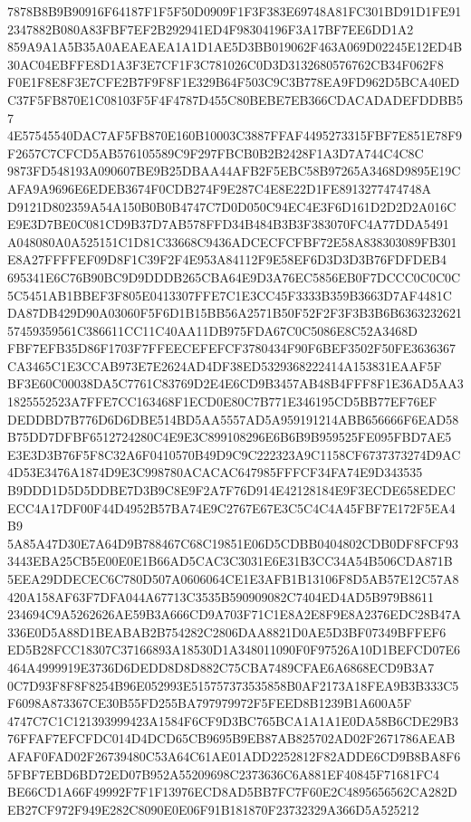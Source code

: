\documentclass[UTF8,fontset=fandol,zihao=-4,a4paper]{ctexart}
\begin{document}
{{7878B8B9B90916F64187F1F5F50D0909F1F3F383E69748A81FC301BD91D1FE912347882B080A83FBF7EF2B292941ED4F98304196F3A17BF7EE6DD1A2
859A9A1A5B35A0AEAEAEA1A1D1AE5D3BB019062F463A069D02245E12ED4B30AC04EBFFE8D1A3F3E7CF1F3C781026C0D3D3132680576762CB34F062F8
F0E1F8E8F3E7CFE2B7F9F8F1E329B64F503C9C3B778EA9FD962D5BCA40EDC37F5FB870E1C08103F5F4F4787D455C80BEBE7EB366CDACADADEFDDBB57
4E57545540DAC7AF5FB870E160B10003C3887FFAF4495273315FBF7E851E78F9F2657C7CFCD5AB576105589C9F297FBCB0B2B2428F1A3D7A744C4C8C
9873FD548193A090607BE9B25DBAA44AFB2F5EBC58B97265A3468D9895E19CAFA9A9696E6EDEB3674F0CDB274F9E287C4E8E22D1FE8913277474748A
D9121D802359A54A150B0B0B4747C7D0D050C94EC4E3F6D161D2D2D2A016CE9E3D7BE0C081CD9B37D7AB578FFD34B484B3B3F383070FC4A77DDA5491
A048080A0A525151C1D81C33668C9436ADCECFCFBF72E58A838303089FB301E8A27FFFFEF09D8F1C39F2F4E953A84112F9E58EF6D3D3D3B76FDFDEB4
695341E6C76B90BC9D9DDDB265CBA64E9D3A76EC5856EB0F7DCCC0C0C0C5C5451AB1BBEF3F805E0413307FFE7C1E3CC45F3333B359B3663D7AF4481C
DA87DB429D90A03060F5F6D1B15BB56A2571B50F52F2F3F3B3B6B636323262157459359561C386611CC11C40AA11DB975FDA67C0C5086E8C52A3468D
FBF7EFB35D86F1703F7FFEECEFEFCF3780434F90F6BEF3502F50FE3636367CA3465C1E3CCAB973E7E2624AD4DF38ED5329368222414A153831EAAF5F
BF3E60C00038DA5C7761C83769D2E4E6CD9B3457AB48B4FFF8F1E36AD5AA31825552523A7FFE7CC163468F1ECD0E80C7B771E346195CD5BB77EF76EF
DEDDBD7B776D6D6DBE514BD5AA5557AD5A959191214ABB656666F6EAD58B75DD7DFBF6512724280C4E9E3C899108296E6B6B9B959525FE095FBD7AE5
E3E3D3B76F5F8C32A6F0410570B49D9C9C222323A9C1158CF6737373274D9AC4D53E3476A1874D9E3C998780ACACAC647985FFFCF34FA74E9D343535
B9DDD1D5D5DDBE7D3B9C8E9F2A7F76D914E42128184E9F3ECDE658EDECECC4A17DF00F44D4952B57BA74E9C2767E67E3C5C4C4A45FBF7E172F5EA4B9
5A85A47D30E7A64D9B788467C68C19851E06D5CDBB0404802CDB0DF8FCF933443EBA25CB5E00E0E1B66AD5CAC3C3031E6E31B3CC34A54B506CDA871B
5EEA29DDECEC6C780D507A0606064CE1E3AFB1B13106F8D5AB57E12C57A8420A158AF63F7DFA044A67713C3535B590909082C7404ED4AD5B979B8611
234694C9A5262626AE59B3A666CD9A703F71C1E8A2E8F9E8A2376EDC28B47A336E0D5A88D1BEABAB2B754282C2806DAA8821D0AE5D3BF07349BFFEF6
ED5B28FCC18307C37166893A18530D1A348011090F0F97526A10D1BEFCD07E6464A4999919E3736D6DEDD8D8D882C75CBA7489CFAE6A6868ECD9B3A7
0C7D93F8F8F8254B96E052993E515757373535858B0AF2173A18FEA9B3B333C5F6098A873367CE30B55FD255BA797979972F5FEED8B1239B1A600A5F
4747C7C1C121393999423A1584F6CF9D3BC765BCA1A1A1E0DA58B6CDE29B376FFAF7EFCFDC014D4DCD65CB9695B9EB87AB825702AD02F2671786AEAB
AFAF0FAD02F26739480C53A64C61AE01ADD2252812F82ADDE6CD9B8BA8F65FBF7EBD6BD72ED07B952A55209698C2373636C6A881EF40845F71681FC4
BE66CD1A66F49992F7F1F13976ECD8AD5BB7FC7F60E2C4895656562CA282DEB27CF972F949E282C8090E0E06F91B181870F23732329A366D5A525212
}}
\end{document}
